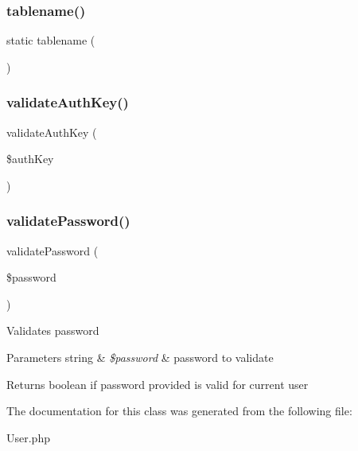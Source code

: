 \hypertarget{classapp_1_1models_1_1_user_aa538c6278f56cff99f77d33cd6cb6981}{}\label{classapp_1_1models_1_1_user_aa538c6278f56cff99f77d33cd6cb6981} 
\subsubsection{\texorpdfstring{tablename()}{tablename()}}
{\footnotesize\ttfamily static tablename (\begin{DoxyParamCaption}{ }\end{DoxyParamCaption})\hspace{0.3cm}{\ttfamily [static]}}

\hypertarget{classapp_1_1models_1_1_user_a54be63849d3e4d8db0fd23142cbc2a69}{}\label{classapp_1_1models_1_1_user_a54be63849d3e4d8db0fd23142cbc2a69} 
\subsubsection{\texorpdfstring{validate\+Auth\+Key()}{validateAuthKey()}}
{\footnotesize\ttfamily validate\+Auth\+Key (\begin{DoxyParamCaption}\item[{}]{\$auth\+Key }\end{DoxyParamCaption})}

\hypertarget{classapp_1_1models_1_1_user_a179b92fbda1d7688a44cdcebf0b50e3f}{}\label{classapp_1_1models_1_1_user_a179b92fbda1d7688a44cdcebf0b50e3f} 
\subsubsection{\texorpdfstring{validate\+Password()}{validatePassword()}}
{\footnotesize\ttfamily validate\+Password (\begin{DoxyParamCaption}\item[{}]{\$password }\end{DoxyParamCaption})}

Validates password


\begin{DoxyParams}[1]{Parameters}
string & {\em \$password} & password to validate \\
\hline
\end{DoxyParams}
\begin{DoxyReturn}{Returns}
boolean if password provided is valid for current user 
\end{DoxyReturn}


The documentation for this class was generated from the following file\+:\begin{DoxyCompactItemize}
\item 
User.\+php\end{DoxyCompactItemize}
